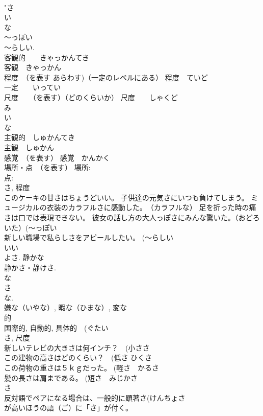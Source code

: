 \documentclass[8pt]{extreport}
\begin{document}
\begin{CJK}{UTF8}{min}
\\	"さ 
\\	い 
\\	な
\\	～っぽい 
\\	～らしい. 
\\	客観的　　きゃっかんてき 
\\	客観　きゃっかん 
\\	程度　（を表す あらわす)（一定のレベルにある） 程度　ていど 
\\	一定　　いってい 
\\	尺度　　（を表す）（どのくらいか） 尺度　　しゃくど 
\\	み 
\\	い 
\\	な
\\	主観的　しゅかんてき 
\\	主観　しゅかん　
\\	感覚　（を表す） 感覚　かんかく　 
\\	場所・点　（を表す） 場所: 
\\	点: 
\\	さ, 程度 
\\	このケーキの甘さはちょうどいい。 子供達の元気さにいつも負けてしまう。 ミュージカルの衣装のカラフルさに感動した。　（カラフルな） 足を折った時の痛さは口では表現できない。 彼女の話し方の大人っぽさにみんな驚いた。（おどろいた）(～っぽい 
\\	新しい職場で私らしさをアピールしたい。 (～らしい 
\\	いい 
\\	よさ. 静かな 
\\	静かさ・静けさ. 
\\	な
\\	さ 
\\	な. 
\\	嫌な（いやな）, 暇な（ひまな）, 変な 
\\	的　
\\	国際的, 自動的, 具体的　(ぐたい 
\\	さ, 尺度 
\\	新しいテレビの大きさは何インチ？　(小ささ 
\\	この建物の高さはどのくらい？　(低さ ひくさ　
\\	この荷物の重さは５ｋｇだった。 (軽さ　かるさ 
\\	髪の長さは肩まである。 (短さ　みじかさ 
\\	さ 
\\	反対語でペアになる場合は、一般的に顕著さ(けんちょさ 
\\	が高いほうの語（ご）に「さ」が付く。 

\end{CJK}
\end{document}
